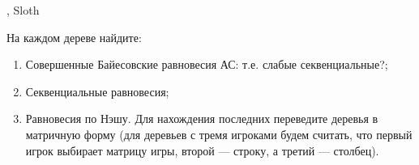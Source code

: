 \begin{problem}[Лес ]\par
\begin{source} \cite{colell:mt}, Sloth \end{source}
На каждом дереве найдите:\par
\begin{enumerate}
\item Совершенные Байесовские равновесия {\red АС: т.е. слабые секвенциальные?};\par
\item Секвенциальные равновесия;\par
\item Равновесия по Нэшу. Для нахождения последних переведите деревья в матричную форму (для деревьев с тремя игроками будем считать, что первый игрок выбирает матрицу игры, второй --- строку, а третий --- столбец).\par
\end{enumerate}
%
%
%





\end{problem}
